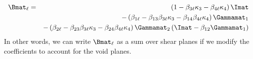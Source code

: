 \begin{eqnarray}
  \Bmat_\ell &=& \left(1 - \beta_{3\ell} \kappa_3 - \beta_{4\ell} \kappa_4\right) \Imat \nonumber\\
  && - \left(\beta_{1\ell} - \beta_{13} \beta_{3\ell} \kappa_3 - \beta_{14} \beta_{4\ell} \kappa_4 \right) \Gammamat_1 \nonumber\\
  && - \left(\beta_{2\ell} - \beta_{23} \beta_{3\ell} \kappa_3 - \beta_{24} \beta_{4\ell} \kappa_4 \right) \Gammamat_2 \left(\Imat - \beta_{12} \Gammamat_1\right)
\end{eqnarray}
In other words, we can write $\Bmat_\ell$ as a sum over shear planes if we modify the coefficients to account for the void planes.